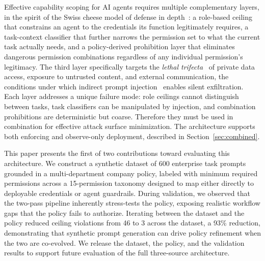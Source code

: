 \documentclass{article}
\theoremstyle{plain}
\theoremstyle{definition}
\theoremstyle{remark}
\begin{document}
Effective capability scoping for AI agents requires multiple complementary layers, in the spirit of the Swiss cheese model of defense in depth~\citep{reason1990human}: a role-based ceiling that constrains an agent to the credentials its function legitimately requires, a task-context classifier that further narrows the permission set to what the current task actually needs, and a policy-derived prohibition layer that eliminates dangerous permission combinations regardless of any individual permission's legitimacy. The third layer specifically targets the \emph{lethal trifecta}~\citep{willison2025trifecta, greshake2023more} of private data access, exposure to untrusted content, and external communication, the conditions under which indirect prompt injection~\citep{greshake2023more} enables silent exfiltration. Each layer addresses a unique failure mode: role ceilings cannot distinguish between tasks, task classifiers can be manipulated by injection, and combination prohibitions are deterministic but coarse. Therefore they must be used in combination for effective attack surface minimization. The architecture supports both enforcing and observe-only deployment, described in Section~\ref{sec:combined}.

This paper presents the first of two contributions toward evaluating this architecture. We construct a synthetic dataset of 600 enterprise task prompts grounded in a multi-department company policy, labeled with minimum required permissions across a 15-permission taxonomy designed to map either directly to deployable credentials or agent guardrails. During validation, we observed that the two-pass pipeline inherently stress-tests the policy, exposing realistic workflow gaps that the policy fails to authorize. Iterating between the dataset and the policy reduced ceiling violations from 46 to 3 across the dataset, a 93\% reduction, demonstrating that synthetic prompt generation can drive policy refinement when the two are co-evolved. We release the dataset, the policy, and the validation results to support future evaluation of the full three-source architecture.
\end{document}
